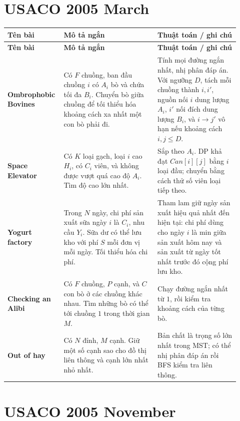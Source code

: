 \documentclass[11pt]{article}
\newenvironment{solutiontable}{%
  \small
  \setlength{\tabcolsep}{4pt}
  \renewcommand{\arraystretch}{1.14}
  \begin{longtable}{L{0.19\linewidth}L{0.39\linewidth}L{0.34\linewidth}}
  \toprule
  \textbf{Tên bài} & \textbf{Mô tả ngắn} & \textbf{Thuật toán / ghi chú}\\
  \midrule
  \endfirsthead
  \toprule
  \textbf{Tên bài} & \textbf{Mô tả ngắn} & \textbf{Thuật toán / ghi chú}\\
  \midrule
  \endhead
}{%
  \bottomrule
  \end{longtable}
  \normalsize
}
\newcommand{\problemrow}[3]{\textbf{#1} & #2 & #3\\\midrule}
\begin{document}
\section{USACO 2005 March}

\begin{solutiontable}
\problemrow{Ombrophobic Bovines}{Có \(F\) chuồng, ban đầu chuồng \(i\) có \(A_i\) bò và chứa tối đa \(B_i\). Chuyển bò giữa chuồng để tối thiểu hóa khoảng cách xa nhất một con bò phải đi.}{Tính mọi đường ngắn nhất, nhị phân đáp án. Với ngưỡng \(D\), tách mỗi chuồng thành \(i,i'\), nguồn nối \(i\) dung lượng \(A_i\), \(i'\) nối đích dung lượng \(B_i\), và \(i\to j'\) vô hạn nếu khoảng cách \(i,j\le D\).}
\problemrow{Space Elevator}{Có \(K\) loại gạch, loại \(i\) cao \(H_i\), có \(C_i\) viên, và không được vượt quá cao độ \(A_i\). Tìm độ cao lớn nhất.}{Sắp theo \(A_i\). DP khả đạt \(Can[i][j]\) bằng \(i\) loại đầu; chuyển bằng cách thử số viên loại tiếp theo.}
\problemrow{Yogurt factory}{Trong \(N\) ngày, chi phí sản xuất sữa ngày \(i\) là \(C_i\), nhu cầu \(Y_i\). Sữa dư có thể lưu kho với phí \(S\) mỗi đơn vị mỗi ngày. Tối thiểu hóa chi phí.}{Tham lam giữ ngày sản xuất hiệu quả nhất đến hiện tại: chi phí dùng cho ngày \(i\) là min giữa sản xuất hôm nay và sản xuất từ ngày tốt nhất trước đó cộng phí lưu kho.}
\problemrow{Checking an Alibi}{Có \(F\) chuồng, \(P\) cạnh, và \(C\) con bò ở các chuồng khác nhau. Tìm những bò có thể tới chuồng \(1\) trong thời gian \(M\).}{Chạy đường ngắn nhất từ \(1\), rồi kiểm tra khoảng cách của từng bò.}
\problemrow{Out of hay}{Có \(N\) đỉnh, \(M\) cạnh. Giữ một số cạnh sao cho đồ thị liên thông và cạnh lớn nhất nhỏ nhất.}{Bản chất là trọng số lớn nhất trong MST; có thể nhị phân đáp án rồi BFS kiểm tra liên thông.}
\end{solutiontable}

\section{USACO 2005 November}
\end{document}
